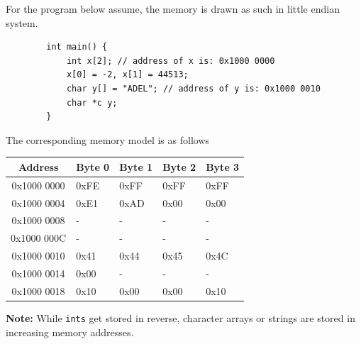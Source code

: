\documentclass[12pt]{article}
\begin{document}
\begin{example}
    For the program below assume, the memory is drawn as such in little endian system.

    \begin{lstlisting}
        int main() {
            int x[2]; // address of x is: 0x1000 0000
            x[0] = -2, x[1] = 44513;
            char y[] = "ADEL"; // address of y is: 0x1000 0010
            char *c y;
        }
    \end{lstlisting}

    The corresponding memory model is as follows

    \begin{center}
        \begin{tabular}{|c|>{\centering\arraybackslash}p{2cm}|>{\centering\arraybackslash}p{2cm}|>{\centering\arraybackslash}p{2cm}|>{\centering\arraybackslash}p{2cm}|}
            \hline
            \textbf{Address} & \textbf{Byte 0} & \textbf{Byte 1} & \textbf{Byte 2} & \textbf{Byte 3} \\
            \hline
            0x1000 0000      & 0xFE            & 0xFF            & 0xFF            & 0xFF            \\
            \hline
            0x1000 0004      & 0xE1            & 0xAD            & 0x00            & 0x00            \\
            \hline
            0x1000 0008      & -               & -               & -               & -               \\
            \hline
            0x1000 000C      & -               & -               & -               & -               \\
            \hline
            0x1000 0010      & 0x41            & 0x44            & 0x45            & 0x4C            \\
            \hline
            0x1000 0014      & 0x00            & -               & -               & -               \\
            \hline
            0x1000 0018      & 0x10            & 0x00            & 0x00            & 0x10            \\
            \hline
        \end{tabular}
    \end{center}

    \textbf{Note:} While \lstinline{ints} get stored in reverse, character arrays or strings are stored in increasing memory addresses.


\end{example}
\end{document}
